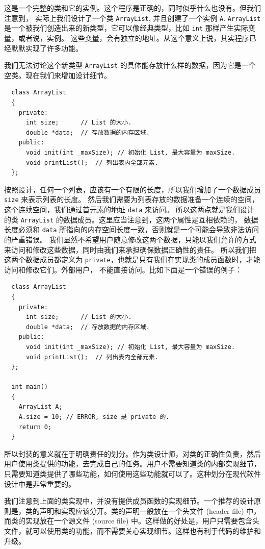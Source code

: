 \documentclass[a4paper]{ctexart}
\theoremstyle{definition}
\theoremstyle{definition}
\begin{document}
这是一个完整的类和它的实例。这个程序是正确的，同时似乎什么也没有。但我们注意到，
实际上我们设计了一个类 \verb|ArrayList|, 并且创建了一个实例 \verb|A|. \verb|ArrayList| 
是一个被我们创造出来的新类型，它可以像经典类型，比如 \verb|int| 那样产生实际变量，或者说，实例。
这些变量，会有独立的地址。从这个意义上说，其实程序已经默默实现了许多功能。

我们无法讨论这个新类型 \verb|ArrayList| 的具体能存放什么样的数据，因为它是一个空类。现在我们来增加设计细节。

\begin{lstlisting}
  class ArrayList
  {
    private:
      int size;      // List 的大小.
      double *data;  // 存放数据的内存区域.
    public:
      void init(int _maxSize); // 初始化 List, 最大容量为 maxSize.
      void printList();  // 列出表内全部元素.
  };  
\end{lstlisting}

按照设计，任何一个列表，应该有一个有限的长度，所以我们增加了一个数据成员 \verb|size| 来表示列表的长度。
然后我们需要为列表存放的数据准备一个连续的空间，这个连续空间，我们通过首元素的地址 \verb|data| 来访问。
所以这两点就是我们设计的类 \verb|ArrayList| 的数据成员。这里应当注意到，这两个属性是互相依赖的，
数据长度必须和 \verb|data| 所指向的内存空间长度一致，否则就是一个可能会导致非法访问的严重错误。
我们显然不希望用户随意修改这两个数据，只能以我们允许的方式来访问和修改这些数据，同时由我们来承担确保数据正确性的责任。
所以我们把这两个数据成员都定义为 \verb|private|，也就是只有我们在实现类的成员函数时，才能访问和修改它们。外部用户，
不能直接访问。比如下面是一个错误的例子： 

\begin{lstlisting}
  class ArrayList
  {
    private:
      int size;      // List 的大小.
      double *data;  // 存放数据的内存区域.
    public:
      void init(int _maxSize); // 初始化 List, 最大容量为 maxSize.
      void printList();  // 列出表内全部元素.
  };  

  int main()
  {
    ArrayList A;
    A.size = 10; // ERROR, size 是 private 的.
    return 0;
  }
\end{lstlisting}

所以封装的意义就在于明确责任的划分。作为类设计师，对类的正确性负责，然后用户使用类提供的功能，去完成自己的任务。用户不需要知道类的内部实现细节，
只需要知道类提供了哪些功能，如何使用这些功能就可以了。这种划分在现代软件设计中是非常重要的。

我们注意到上面的类实现中，并没有提供成员函数的实现细节。一个推荐的设计原则是，类的声明和实现应该分开。类的声明一般放在一个头文件 (header file) 中，
而类的实现放在一个源文件 (source file) 中。这样做的好处是，用户只需要包含头文件，就可以使用类的功能，而不需要关心实现细节。这样也有利于代码的维护和升级。
\end{document}
